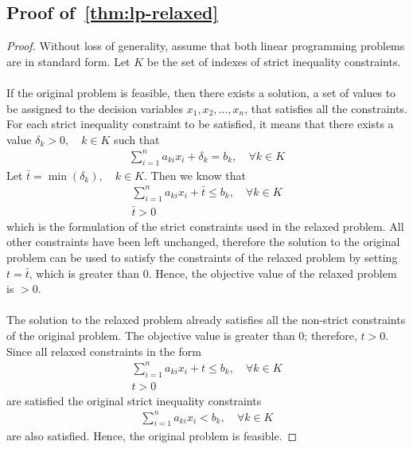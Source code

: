 \documentclass[runningheads]{llncs}
\begin{document}
\newpage
\begin{subappendices}
    \renewcommand{\thesection}{\Alph{section}}%
    \section{Proof of~\autoref{thm:lp-relaxed}}
    \begin{proof}
        Without loss of generality, assume that both linear programming problems are in standard form.
        Let $K$ be the set of indexes of strict inequality constraints.
        \\
         \\

        If the original problem is feasible, then there exists a solution, a set of values to be assigned to the decision variables $x_1, x_2, \ldots, x_n$, that satisfies all the constraints.
        For each strict inequality constraint to be satisfied, it means that there exists a value $\delta_k > 0, \quad k \in K$ such that
        \begin{align*}
            \sum_{i=1}^{n} a_{ki}x_{i} + \delta_k = b_k, \quad \forall k \in K
        \end{align*}
        Let $\bar{t} = \min(\delta_k), \quad k \in K$.
        Then we know that
        \begin{align*}
            \sum_{i=1}^{n} a_{ki}x_{i} + \bar{t} \le b_k, \quad \forall k \in K \\
            \bar{t} > 0
        \end{align*}
        which is the formulation of the strict constraints used in the relaxed problem.
        All other constraints have been left unchanged, therefore the solution to the original problem can be used to satisfy the constraints of the relaxed problem by setting $t = \bar{t}$, which is greater than $0$.
        Hence, the objective value of the relaxed problem is $> 0$.
        \\
         \\

        The solution to the relaxed problem already satisfies all the non-strict constraints of the original problem.
        The objective value is greater than $0$; therefore, $t > 0$.
        Since all relaxed constraints in the form
        \begin{align*}
            \sum_{i=1}^{n} a_{ki}x_{i} + t \le b_k, \quad \forall k \in K \\
            t > 0
        \end{align*}
        are satisfied the original strict inequality constraints
        \begin{align*}
            \sum_{i=1}^{n} a_{ki}x_{i} < b_k, \quad \forall k \in K
        \end{align*}
        are also satisfied.
        Hence, the original problem is feasible.
    \end{proof}


\end{subappendices}
\end{document}
